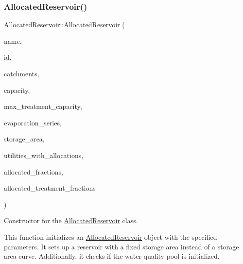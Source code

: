 \subsubsection{\texorpdfstring{Allocated\+Reservoir()}{AllocatedReservoir()}\hspace{0.1cm}{\footnotesize\ttfamily [3/5]}}
{\footnotesize\ttfamily Allocated\+Reservoir\+::\+Allocated\+Reservoir (\begin{DoxyParamCaption}\item[{const char $\ast$}]{name,  }\item[{const int}]{id,  }\item[{const vector$<$ \mbox{\hyperlink{classCatchment}{Catchment}} $\ast$$>$ \&}]{catchments,  }\item[{const double}]{capacity,  }\item[{const double}]{max\+\_\+treatment\+\_\+capacity,  }\item[{\mbox{\hyperlink{classEvaporationSeries}{Evaporation\+Series}} \&}]{evaporation\+\_\+series,  }\item[{double}]{storage\+\_\+area,  }\item[{vector$<$ int $>$ $\ast$}]{utilities\+\_\+with\+\_\+allocations,  }\item[{vector$<$ double $>$ $\ast$}]{allocated\+\_\+fractions,  }\item[{vector$<$ double $>$ $\ast$}]{allocated\+\_\+treatment\+\_\+fractions }\end{DoxyParamCaption})}



Constructor for the \mbox{\hyperlink{classAllocatedReservoir}{Allocated\+Reservoir}} class. 

This function initializes an \mbox{\hyperlink{classAllocatedReservoir}{Allocated\+Reservoir}} object with the specified parameters. It sets up a reservoir with a fixed storage area instead of a storage area curve. Additionally, it checks if the water quality pool is initialized.


